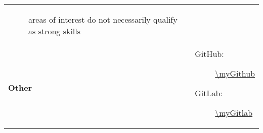 \documentclass[../../main.tex]{subfiles}
\begin{document}
\begin{tabularx}{\textwidth}{>{\bfseries} p{2.5cm} X}
\begin{description}
                \item[\ii{Note:}] areas of interest do not necessarily qualify as strong skills
            \end{description}\\
        Other &
            \begin{description}
                \item[GitHub:] \url{\myGithub}
                \item[GitLab:] \url{\myGitlab}
            \end{description}\\
    \end{tabularx}
\end{document}

